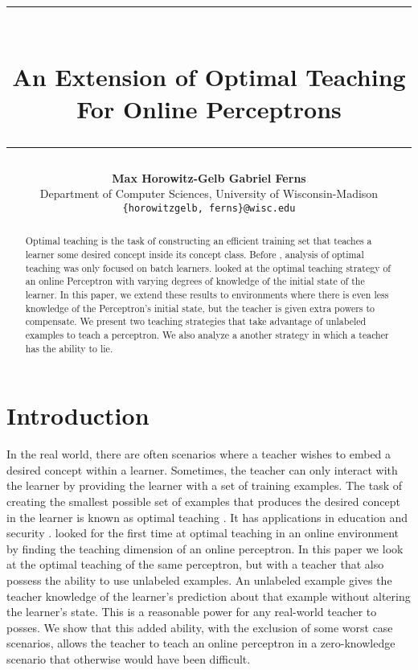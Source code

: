 \documentclass{article}
\title{\rule{350pt}{5pt}\\ \textbf{An Extension of Optimal Teaching For Online Perceptrons} \\ \rule{350pt}{1pt}}
\author{
  \textbf{Max Horowitz-Gelb \qquad Gabriel Ferns}\\
  Department of Computer Sciences, University of Wisconsin-Madison\\
  \texttt{\{horowitzgelb, ferns\}@wisc.edu}\\
}
\begin{document}

\maketitle

\begin{abstract}
  Optimal teaching is the task of constructing an efficient training set
  that teaches a learner some desired concept inside its concept class. Before
  \cite{perceptron}, analysis of optimal teaching was only focused on batch
  learners. \cite{perceptron} looked at the optimal teaching strategy of an
  online Perceptron with varying degrees of knowledge of the initial state of
  the learner. In this paper, we extend these results to environments where
  there is even less knowledge of the Perceptron's initial state, but the
  teacher is given extra powers to compensate. We present two teaching strategies that take advantage of unlabeled examples to teach a perceptron. We also analyze a another strategy in which a teacher has the ability to
  lie.
\end{abstract}

\section{Introduction}
In the real world, there are often scenarios where a teacher wishes to
embed a desired concept within a learner. Sometimes, the teacher can only
interact with the learner by providing the learner with a set of training examples.
The task of creating the smallest possible set of examples that
produces the desired concept in the learner is known as optimal teaching
\cite{machine_teaching} \cite{teaching_dimension}\cite{td_linear}. It has applications in education and security \cite{security}\cite{education} \cite{poisoning}. \cite{perceptron} looked for
the first time at optimal teaching in an online environment by finding the teaching dimension of an online perceptron. In this paper we look at the
optimal teaching of the same perceptron, but with a teacher that also possess
the ability to use unlabeled examples. An unlabeled example gives the teacher
knowledge of the learner's prediction about that example without altering the
learner's state. This is a reasonable power for any real-world teacher to
posses. We show that this added ability, with the exclusion of some worst case scenarios, allows the teacher to teach an
online perceptron in a zero-knowledge scenario that otherwise would have been
difficult.
\end{document}
